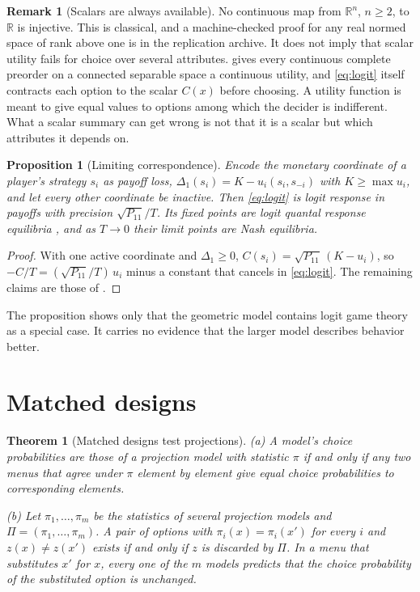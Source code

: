 \documentclass[11pt]{article}
\newtheorem{theorem}{Theorem}
\newtheorem{proposition}{Proposition}
\theoremstyle{definition}
\newtheorem{remark}{Remark}
\newcommand{\R}{\mathbb{R}}
\begin{document}
\begin{remark}[Scalars are always available]
No continuous map from $\R^n$, $n \ge 2$, to $\R$ is injective.
This is classical, and a machine-checked proof for any real normed space of rank above one is in the replication archive.
It does not imply that scalar utility fails for choice over several attributes.
\citet{Debreu1954} gives every continuous complete preorder on a connected separable space a continuous utility, and \eqref{eq:logit} itself contracts each option to the scalar $C(x)$ before choosing.
A utility function is meant to give equal values to options among which the decider is indifferent.
What a scalar summary can get wrong is not that it is a scalar but which attributes it depends on.
\end{remark}

\begin{proposition}[Limiting correspondence]\label{prop:limit}
Encode the monetary coordinate of a player's strategy $s_i$ as payoff loss, $\Delta_1(s_i) = K - u_i(s_i, s_{-i})$ with $K \ge \max u_i$, and let every other coordinate be inactive.
Then \eqref{eq:logit} is logit response in payoffs with precision $\sqrt{P_{11}}/T$.
Its fixed points are logit quantal response equilibria \citep{McKelveyPalfrey1995}, and as $T \to 0$ their limit points are Nash equilibria.
\end{proposition}

\begin{proof}
With one active coordinate and $\Delta_1 \ge 0$, $C(s_i) = \sqrt{P_{11}}\,(K - u_i)$, so $-C/T = (\sqrt{P_{11}}/T)\,u_i$ minus a constant that cancels in \eqref{eq:logit}.
The remaining claims are those of \citet{McKelveyPalfrey1995}.
\end{proof}

The proposition shows only that the geometric model contains logit game theory as a special case.
It carries no evidence that the larger model describes behavior better.

\section{Matched designs}\label{sec:matched}

\begin{theorem}[Matched designs test projections]\label{thm:matched}
(a) A model's choice probabilities are those of a projection model with statistic $\pi$ if and only if any two menus that agree under $\pi$ element by element give equal choice probabilities to corresponding elements.

(b) Let $\pi_1, \dots, \pi_m$ be the statistics of several projection models and $\Pi = (\pi_1, \dots, \pi_m)$.
A pair of options with $\pi_i(x) = \pi_i(x')$ for every $i$ and $z(x) \ne z(x')$ exists if and only if $z$ is discarded by $\Pi$.
In a menu that substitutes $x'$ for $x$, every one of the $m$ models predicts that the choice probability of the substituted option is unchanged.
\end{theorem}
\end{document}
